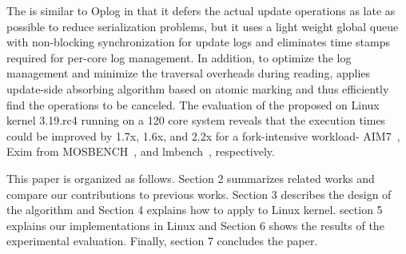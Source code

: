 The  is similar to Oplog in that it defers the actual update operations as late as 
possible to reduce serialization problems, but it uses a light weight global queue with
non-blocking synchronization for update logs and eliminates time stamps required for 
per-core log management. 
In addition, to optimize the log management and minimize the traversal overheads 
during reading,  applies update-side absorbing algorithm based on atomic
marking and thus efficiently find the operations to be canceled. 
The evaluation of the proposed  on Linux kernel 3.19.rc4 running on a 120 core system
reveals that 
the execution times could be improved by 1.7x, 1.6x, and 2.2x for 
a fork-intensive workload-
AIM7~\cite{AIM7Benchmark}, Exim from
MOSBENCH~\cite{SilasBoydWickizer2010LinuxScales48}, and 
lmbench~\cite{mcvoy1996lmbench}, respectively.




This paper is organized as follows. 
Section 2 summarizes related works and compare our contributions to previous
works. 
Section 3 describes the design of the  algorithm and 
Section 4 explains how to apply to Linux kernel.
section 5 explains our implementations in Linux and
Section 6 shows the results of the experimental evaluation. 
Finally, section 7 concludes the paper.

